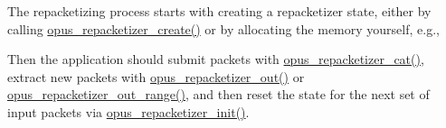 The repacketizing process starts with creating a repacketizer state, either by calling \mbox{\hyperlink{group__opus__repacketizer_gaa70e9708619188f673b5dc3f494c46ea}{opus\+\_\+repacketizer\+\_\+create()}} or by allocating the memory yourself, e.\+g., 
\begin{DoxyCode}{0}
\end{DoxyCode}


Then the application should submit packets with \mbox{\hyperlink{group__opus__repacketizer_gaa739f0bbc0ad09ad159ffb6455a6bb55}{opus\+\_\+repacketizer\+\_\+cat()}}, extract new packets with \mbox{\hyperlink{group__opus__repacketizer_gaa1b5f68279829dcbaf31d374b2f3eac4}{opus\+\_\+repacketizer\+\_\+out()}} or \mbox{\hyperlink{group__opus__repacketizer_gad06762a8f4032823f6b64b63e8416efc}{opus\+\_\+repacketizer\+\_\+out\+\_\+range()}}, and then reset the state for the next set of input packets via \mbox{\hyperlink{group__opus__repacketizer_gadef533688e80dcc96a32b955657aaf28}{opus\+\_\+repacketizer\+\_\+init()}}.

